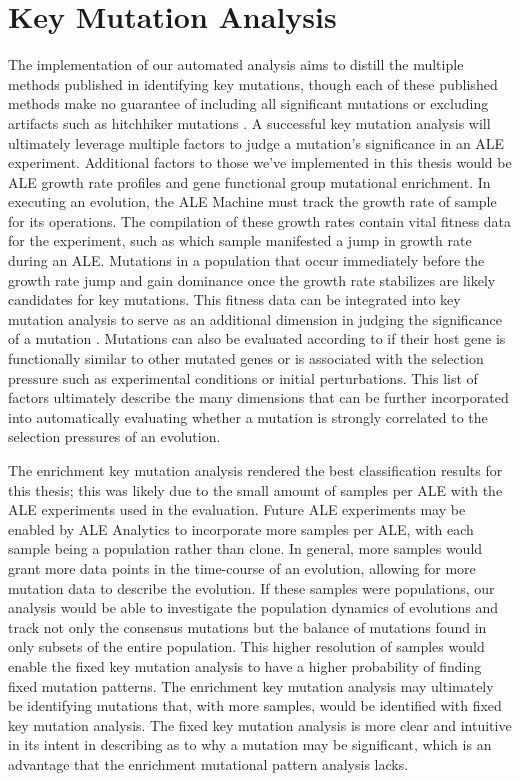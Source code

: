 \documentclass[12pt,final,masters,chapterheads]{ucsd}  %
\begin{document}
\section{Key Mutation Analysis}
%
%
%
%
The implementation of our automated analysis aims to distill the multiple methods published in identifying key mutations, though each of these published methods make no guarantee of including all significant mutations or excluding artifacts such as hitchhiker mutations \cite{pmid25304508}. A successful key mutation analysis will ultimately leverage multiple factors to judge a mutation's significance in an ALE experiment. Additional factors to those we've implemented in this thesis would be ALE growth rate profiles and gene functional group mutational enrichment. In executing an evolution, the ALE Machine must track the growth rate of sample for its operations. The compilation of these growth rates contain vital fitness data for the experiment, such as which sample manifested a jump in growth rate during an ALE. Mutations in a population that occur immediately before the growth rate jump and gain dominance once the growth rate stabilizes are likely candidates for key mutations. This fitness data can be integrated into key mutation analysis to serve as an additional dimension in judging the significance of a mutation \cite{pmid25304508}. Mutations can also be evaluated according to if their host gene is functionally similar to other mutated genes or is associated with the selection pressure such as experimental conditions or initial perturbations. This list of factors ultimately describe the many dimensions that can be further incorporated into automatically evaluating whether a mutation is strongly correlated to the selection pressures of an evolution.

The enrichment key mutation analysis rendered the best classification results for this thesis; this was likely due to the small amount of samples per ALE with the ALE experiments used in the evaluation. Future ALE experiments may be enabled by ALE Analytics to incorporate more samples per ALE, with each sample being a population rather than clone. In general, more samples would grant more data points in the time-course of an evolution, allowing for more mutation data to describe the evolution. If these samples were populations, our analysis would be able to investigate the population dynamics of evolutions and track not only the consensus mutations but the balance of mutations found in only subsets of the entire population. This higher resolution of samples would enable the fixed key mutation analysis to have a higher probability of finding fixed mutation patterns. The enrichment key mutation analysis may ultimately be identifying mutations that, with more samples, would be identified with fixed key mutation analysis. The fixed key mutation analysis is more clear and intuitive in its intent in describing as to why a mutation may be significant, which is an advantage that the enrichment mutational pattern analysis lacks.
\end{document}
